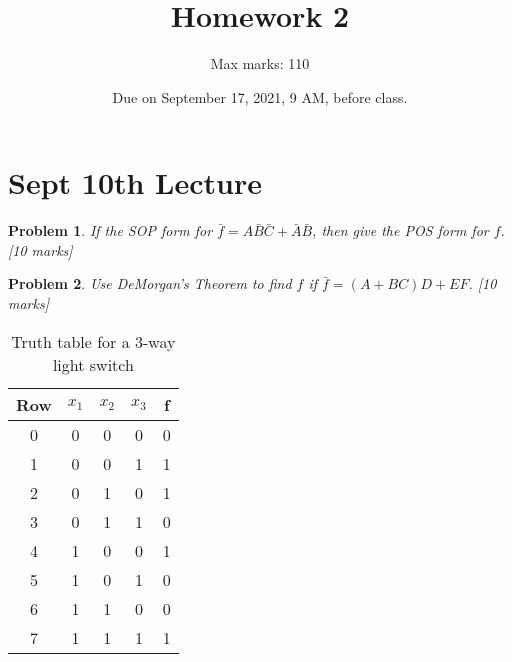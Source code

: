 \documentclass[twocolumn]{article}
\title{Homework 2}
\author{Max marks: 110}
\date{Due on September 17, 2021, 9 AM, before class.}
\newtheorem{prob}{Problem}
\newcommand{\bA}{\bar{A}}
\newcommand{\bB}{\bar{B}}
\newcommand{\bC}{\bar{C}}
\begin{document}
\maketitle

\section{Sept 10th Lecture}
\begin{prob}
If the SOP form for $ \bar{f} = A\bB\bC+\bA\bB$, then give the POS form for
$f$. [10 marks]
\end{prob}

\begin{prob}
Use DeMorgan's Theorem to find $f$  if  $\bar{f} = (A + BC)D + EF$. [10 marks]
\end{prob}



\begin{table}
  \centering
  \begin{tabular}{c|ccc||c}
    \toprule
    Row & $x_1$ & $x_2$ & $x_3$ & f \\
    \midrule
    0 & 0 & 0 & 0 & 0 \\
    1 & 0 & 0 & 1 & 1 \\
    2 & 0 & 1 & 0 & 1 \\
    3 & 0 & 1 & 1 & 0 \\
    4 & 1 & 0 & 0 & 1 \\
    5 & 1 & 0 & 1 & 0 \\
    6 & 1 & 1 & 0 & 0 \\
    7 & 1 & 1 & 1 & 1 \\
    \bottomrule
    \end{tabular}
    \caption{Truth table for a 3-way light switch}
    \label{tab:3-way-light-switch}
\end{table}
\end{document}
